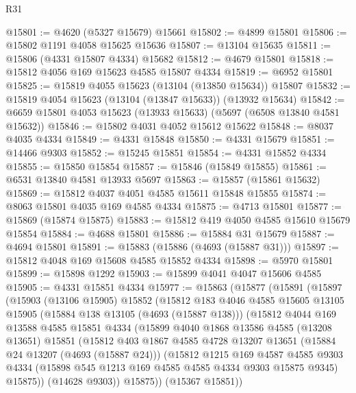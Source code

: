 \begin{lexlean}{R31}
\begin{coremodule}
@15801 := @4620 (@5327 @15679) @15661
@15802 := @4899 @15801
@15806 := @15802 @1191 @4058 @15625 @15636
@15807 := @13104 @15635
@15811 := @15806 (@4331 @15807 @4334) @15682
@15812 := @4679 @15801
@15818 := @15812 @4056 @169 @15623 @4585 @15807 @4334
@15819 := @6952 @15801
@15825 := @15819 @4055 @15623 (@13104 (@13850 @15634)) @15807
@15832 := @15819 @4054 @15623 (@13104 (@13847 @15633)) (@13932 @15634)
@15842 := @6659 @15801 @4053 @15623 (@13933 @15633) (@5697 (@6508 @13840 @4581 @15632))
@15846 := @15802 @4031 @4052 @15612 @15622
@15848 := @8037 @4035 @4334
@15849 := @4331 @15848
@15850 := @4331 @15679
@15851 := @14466 @9303
@15852 := @15245 @15851
@15854 := @4331 @15852 @4334
@15855 := @15850 @15854
@15857 := @15846 (@15849 @15855)
@15861 := @6531 @13840 @4581 @13933 @5697
@15863 := @15857 (@15861 @15632)
@15869 := @15812 @4037 @4051 @4585 @15611 @15848 @15855
@15874 := @8063 @15801 @4035 @169 @4585 @4334
@15875 := @4713 @15801
@15877 := @15869 (@15874 @15875)
@15883 := @15812 @419 @4050 @4585 @15610 @15679 @15854
@15884 := @4688 @15801
@15886 := @15884 @31 @15679
@15887 := @4694 @15801
@15891 := @15883 (@15886 (@4693 (@15887 @31)))
@15897 := @15812 @4048 @169 @15608 @4585 @15852 @4334
@15898 := @5970 @15801
@15899 := @15898 @1292
@15903 := @15899 @4041 @4047 @15606 @4585
@15905 := @4331 @15851 @4334
@15977 := @15863
    (@15877
      (@15891
        (@15897
          (@15903
            (@13106 @15905)
            @15852
            (@15812
              @183
              @4046
              @4585
              @15605
              @13105
              @15905
              (@15884 @138 @13105 (@4693 (@15887 @138)))
              (@15812
                @4044
                @169
                @13588
                @4585
                @15851
                @4334
                (@15899
                  @4040
                  @1868
                  @13586
                  @4585
                  (@13208 @13651)
                  @15851
                  (@15812
                    @403
                    @1867
                    @4585
                    @4728
                    @13207
                    @13651
                    (@15884 @24 @13207 (@4693 (@15887 @24)))
                    (@15812
                      @1215
                      @169
                      @4587
                      @4585
                      @9303
                      @4334
                      (@15898 @545 @1213 @169 @4585 @4585 @4334 @9303 @15875 @9345)
                      @15875))
                  (@14628 @9303))
                @15875))
            (@15367 @15851))

\end{coremodule}
\end{lexlean}
